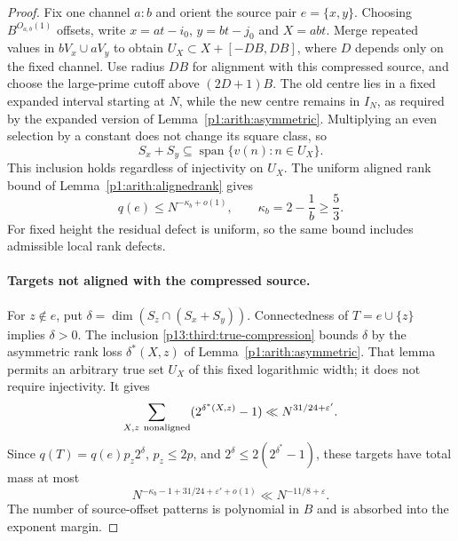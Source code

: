 \begin{proof}
Fix one channel $a:b$ and orient the source pair $e=\{x,y\}$.
Choosing $B^{O_{a,b}(1)}$ offsets, write
$x=at-i_0$, $y=bt-j_0$ and $X=abt$.
Merge repeated values in $bV_x\cup aV_y$ to obtain
$U_X\subset X+[-D B,D B]$, where $D$ depends only on the fixed channel.
Use radius $DB$ for alignment with this compressed source, and choose
the large-prime cutoff above $(2D+1)B$.  The old centre lies in a fixed
expanded interval starting at $N$, while the new centre remains in $I_N$,
as required by the expanded version of Lemma~\ref{p1:arith:asymmetric}.
Multiplying an even selection by a constant does not change its square
class, so
\begin{equation}
 S_x+S_y\subseteq
       \operatorname{span}\{v(n):n\in U_X\}.
 \label{p13:third:true-compression}
\end{equation}
This inclusion holds regardless of injectivity on $U_X$.
The uniform aligned rank bound of
Lemma~\ref{p1:arith:alignedrank} gives
\begin{equation}
 q(e)\leq N^{-\kappa_b+o(1)},\qquad
                   \kappa_b=2-\frac1b\geq\frac53.
 \label{p13:third:source-weight}
\end{equation}
For fixed height the residual defect is uniform, so the same bound
includes admissible local rank defects.

\paragraph{Targets not aligned with the compressed source.}
For $z\notin e$, put
$\delta=\dim(S_z\cap(S_x+S_y))$.
Connectedness of $T=e\cup\{z\}$ implies $\delta>0$.
The inclusion \eqref{p13:third:true-compression} bounds $\delta$ by
the asymmetric rank loss $\delta^*(X,z)$ of
Lemma~\ref{p1:arith:asymmetric}.  That lemma permits an arbitrary true
set $U_X$ of this fixed logarithmic width; it does not require injectivity.
It gives
\[
 \sum_{X,z\ {\rm nonaligned}}(2^{\delta^*(X,z)}-1)
                         \ll N^{31/24+\varepsilon'}.
\]
Since $q(T)=q(e)p_z2^\delta$, $p_z\leq2p$, and
$2^\delta\leq2(2^{\delta^*}-1)$, these targets have total mass at most
\begin{equation}
 N^{-\kappa_b-1+31/24+\varepsilon'+o(1)}
                     \ll N^{-11/8+\varepsilon}.
 \label{p13:third:unaligned-target-cost}
\end{equation}
The number of source-offset patterns is polynomial in $B$ and is
absorbed into the exponent margin.


\end{proof}
